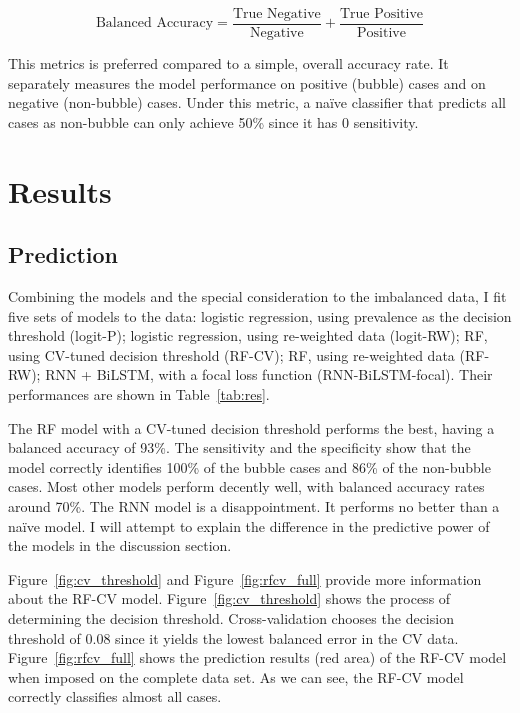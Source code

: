 \documentclass[12pt, man, a4paper, floatsintext]{apa7}
\begin{document}
\begin{equation}
    \text{Balanced Accuracy} = \frac{\text{True Negative}}{\text{Negative}} + 
                               \frac{\text{True Positive}}{\text{Positive}}
    \label{eq:ba}
\end{equation}

This metrics is preferred compared to a simple, overall accuracy rate. It separately measures the model performance on positive (bubble) cases and on negative (non-bubble) cases. Under this metric, a naïve classifier that predicts all cases as non-bubble can only achieve 50\% since it has 0 sensitivity.


\section{Results}

\subsection{Prediction}

Combining the models and the special consideration to the imbalanced data, I fit five sets of models to the data: logistic regression, using prevalence as the decision threshold (logit-P); logistic regression, using re-weighted data (logit-RW); RF, using CV-tuned decision threshold (RF-CV); RF, using re-weighted data (RF-RW); RNN + BiLSTM, with a focal loss function (RNN-BiLSTM-focal). Their performances are shown in Table~\ref{tab:res}.



The RF model with a CV-tuned decision threshold performs the best, having a balanced accuracy of 93\%. The sensitivity and the specificity show that the model correctly identifies 100\% of the bubble cases and 86\% of the non-bubble cases. Most other models perform decently well, with balanced accuracy rates around 70\%. The RNN model is a disappointment. It performs no better than a naïve model. I will attempt to explain the difference in the predictive power of the models in the discussion section.

Figure~\ref{fig:cv_threshold} and Figure~\ref{fig:rfcv_full} provide more information about the RF-CV model. Figure~\ref{fig:cv_threshold} shows the process of determining the decision threshold. Cross-validation chooses the decision threshold of 0.08 since it yields the lowest balanced error in the CV data. Figure~\ref{fig:rfcv_full} shows the prediction results (red area) of the RF-CV model when imposed on the complete data set. As we can see, the RF-CV model correctly classifies almost all cases. 
\end{document}
